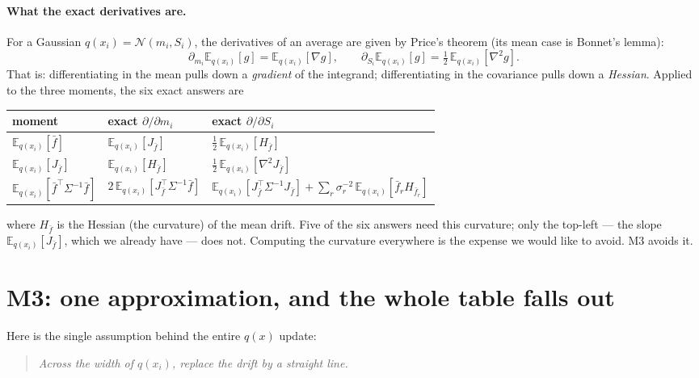 \documentclass[11pt]{article}
\newcommand{\E}{\mathbb{E}}
\newcommand{\Eqx}{\E_{q(x_i)}}
\begin{document}
\paragraph{What the exact derivatives are.}
For a Gaussian $q(x_i)=\mathcal N(m_i,S_i)$, the derivatives of an average
are given by Price's theorem (its mean case is Bonnet's lemma):
\begin{equation}
\partial_{m_i}\Eqx[g] = \Eqx[\nabla g],
\qquad
\partial_{S_i}\Eqx[g] = \tfrac12\,\Eqx[\nabla^2 g].
\label{eq:price}
\end{equation}
That is: differentiating in the mean pulls down a \emph{gradient} of the
integrand; differentiating in the covariance pulls down a \emph{Hessian}.
Applied to the three moments, the six exact answers are
\begin{center}
\renewcommand{\arraystretch}{1.5}\small
\begin{tabular}{@{}p{3.0cm} p{4.2cm} p{7.4cm}@{}}
\toprule
moment & exact $\partial/\partial m_i$ & exact $\partial/\partial S_i$ \\
\midrule
$\Eqx[\bar f]$
  & $\Eqx[J_{\bar f}]$
  & $\tfrac12\,\Eqx[H_{\bar f}]$ \\
$\Eqx[J_{\bar f}]$
  & $\Eqx[H_{\bar f}]$
  & $\tfrac12\,\Eqx[\nabla^2 J_{\bar f}]$ \\
$\Eqx[\bar f^\top\Sigma^{-1}\bar f]$
  & $2\,\Eqx[J_{\bar f}^\top\Sigma^{-1}\bar f]$
  & $\Eqx[J_{\bar f}^\top\Sigma^{-1}J_{\bar f}]
    + \sum_r\sigma_r^{-2}\,\Eqx[\bar f_r H_{\bar f_r}]$ \\
\bottomrule
\end{tabular}
\end{center}
where $H_{\bar f}$ is the Hessian (the curvature) of the mean drift. Five
of the six answers need this curvature; only the top-left --- the slope
$\Eqx[J_{\bar f}]$, which we already have --- does not. Computing the
curvature everywhere is the expense we would like to avoid. M3 avoids it.

\section{M3: one approximation, and the whole table falls out}

Here is the single assumption behind the entire $q(x)$ update:

\begin{quote}\itshape
Across the width of $q(x_i)$, replace the drift by a straight line.
\end{quote}
\end{document}
